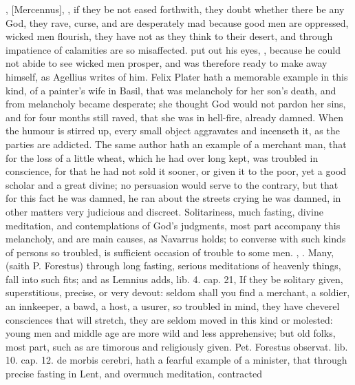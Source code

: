 {, [Mercennus], , if
they be not eased forthwith, they doubt whether there be any God, they
rave, curse, and are desperately mad because good men are oppressed,
wicked men flourish, they have not as they think to their desert, and
through impatience of calamities are so misaffected. \Democritus{} put out
his eyes, , because he
could not abide to see wicked men prosper, and was therefore ready to
make away himself, as Agellius writes of him. Felix Plater hath a
memorable example in this kind, of a painter's wife in Basil, that was
melancholy for her son's death, and from melancholy became desperate;
she thought God would not pardon her sins, and for four months
still raved, that she was in hell-fire, already damned. When the humour
is stirred up, every small object aggravates and incenseth it, as the
parties are addicted. The same author hath an example of a
merchant man, that for the loss of a little wheat, which he had over
long kept, was troubled in conscience, for that he had not sold it
sooner, or given it to the poor, yet a good scholar and a great divine;
no persuasion would serve to the contrary, but that for this fact he
was damned, he ran about the streets crying he was damned, in other matters
very judicious and discreet. Solitariness, much fasting, divine meditation, and
contemplations of God's judgments, most part accompany this melancholy, and are
main causes, as Navarrus holds; to converse with such
kinds of persons so troubled, is sufficient occasion of trouble to some men.
, \etc{}. Many, (saith P. Forestus) through
long fasting, serious meditations of heavenly things, fall into such fits;
and as Lemnius adds, lib. 4. cap. 21, If they be solitary given,
superstitious, precise, or very devout: seldom shall you find a
merchant, a soldier, an innkeeper, a bawd, a host, a usurer, so
troubled in mind, they have cheverel consciences that will stretch,
they are seldom moved in this kind or molested: young men and middle
age are more wild and less apprehensive; but old folks, most part, such
as are timorous and religiously given. Pet. Forestus observat. lib. 10.
cap. 12. de morbis cerebri, hath a fearful example of a minister, that
through precise fasting in Lent, and overmuch meditation, contracted
}
